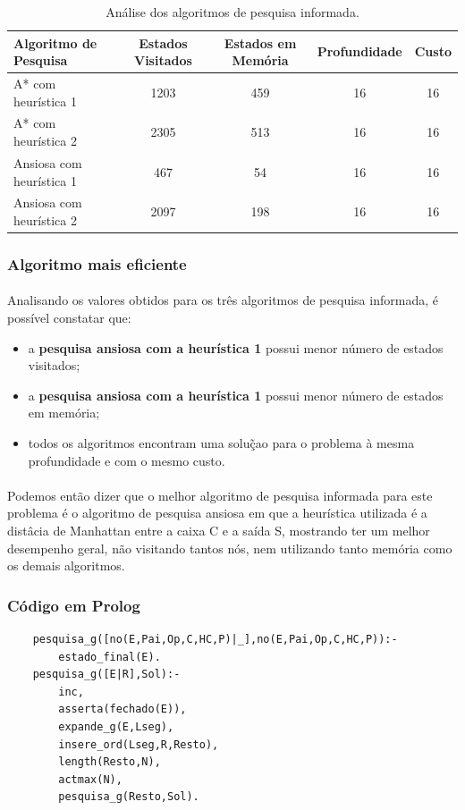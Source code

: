 \documentclass{article}
\begin{document}
\begin{table}[h]
\centering
\begin{tabular}{l|c|c|c|c}
Algoritmo de Pesquisa & Estados Visitados & Estados em Memória & Profundidade & Custo \\\hline
A* com heurística 1 & 1203 & 459 & 16 & 16 \\\hline
A* com heurística 2 & 2305 & 513 & 16 & 16 \\\hline
Ansiosa com heurística 1 & 467 & 54 & 16 & 16 \\\hline
Ansiosa com heurística 2 & 2097 & 198 & 16 & 16 
\end{tabular}
\caption{\label{tab:pni}Análise dos algoritmos de pesquisa informada.}
\end{table}

\subsubsection{Algoritmo mais eficiente}
\paragraph{} Analisando os valores obtidos para os três algoritmos de pesquisa informada, é possível constatar que:
\begin{itemize}
  \item a \textbf{pesquisa ansiosa com a heurística 1} possui menor número de estados visitados;
  \item a \textbf{pesquisa ansiosa com a heurística 1} possui menor número de estados em memória;
  \item todos os algoritmos encontram uma soluç̃ao para o problema à mesma profundidade e com o mesmo custo.
\end{itemize}

\paragraph{} Podemos então dizer que o melhor algoritmo de pesquisa informada para este problema é o algoritmo de pesquisa ansiosa em que a heurística utilizada é a distâcia de Manhattan entre a caixa C e a saída S, mostrando ter um melhor desempenho geral, não visitando tantos nós, nem utilizando tanto memória como os demais algoritmos.

\subsubsection{Código em Prolog}
\begin{verbatim}
    pesquisa_g([no(E,Pai,Op,C,HC,P)|_],no(E,Pai,Op,C,HC,P)):-
        estado_final(E).
    pesquisa_g([E|R],Sol):- 
        inc, 
        asserta(fechado(E)), 
        expande_g(E,Lseg),
        insere_ord(Lseg,R,Resto),
        length(Resto,N),
        actmax(N),
        pesquisa_g(Resto,Sol).
\end{verbatim}
\end{document}
